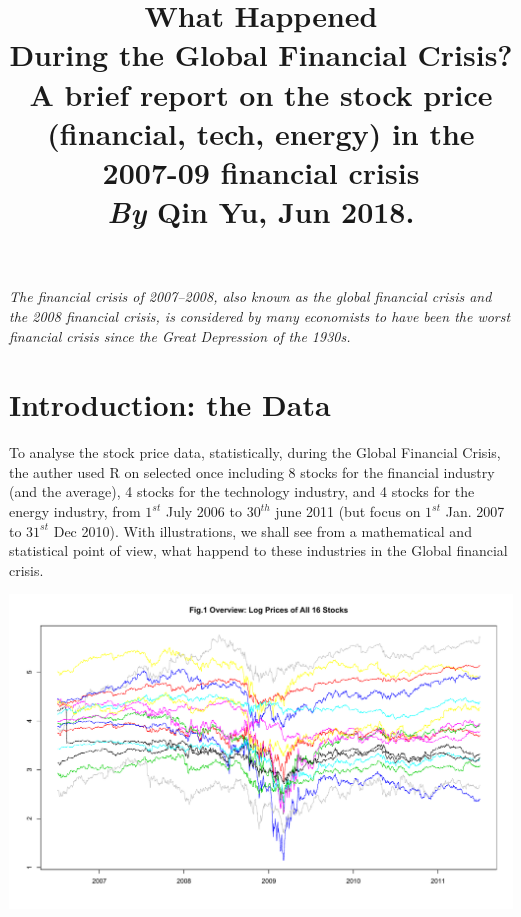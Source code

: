 \documentclass[11pt]{article}
\begin{document}
\title{
\vspace{-2em}
  \raggedright
  \textbf{What Happened \\During the Global Financial Crisis?} \\
  \vspace{0.3em}
  \large A brief report on the stock price (financial, tech, energy) in the 2007-09 financial crisis \\
  \vspace{1em}
  \textit{By} \textbf{Qin Yu}, Jun 2018. 
}
\date{}
\maketitle

\vspace{-5em}
\hspace{10em}
\parbox[position]{30em}{\textit{The financial crisis of 2007–2008, also known as the global financial crisis and the 2008 financial crisis, is considered by many economists to have been the worst financial crisis since the Great Depression of the 1930s.\cite{Wiki}}}

\section{Introduction: the Data}\vspace{-1em}
To analyse the stock price data, statistically, during the Global Financial Crisis, the auther used R on selected once including 8 stocks for the financial industry (and the average), 4 stocks for the technology industry, and 4 stocks for the energy industry, from $1^{st}$ July 2006 to $30^{th}$ june 2011 (but focus on $1^{st}$ Jan. 2007 to $31^{st}$ Dec 2010). With illustrations, we shall see from a mathematical and statistical point of view, what happend to these industries in the Global financial crisis.
\begin{center}
\includegraphics[width=1\linewidth]{graph/Fig1OverviewLogPricesOfAll16Stocks.pdf}
\end{center}
\end{document}
